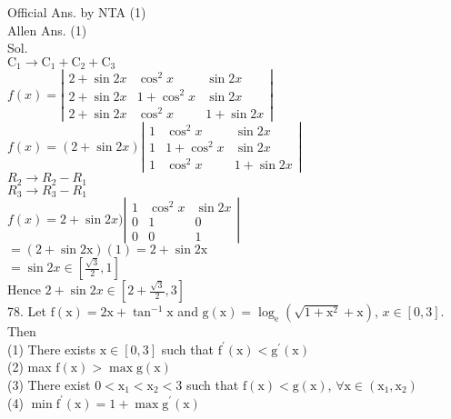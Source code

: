 \documentclass[10pt]{article}
\begin{document}
Official Ans. by NTA (1)\\
Allen Ans. (1)\\
Sol.\\
\(\mathrm{C}_{1} \rightarrow \mathrm{C}_{1}+\mathrm{C}_{2}+\mathrm{C}_{3}\)\\
\(f(x)=\left|\begin{array}{ccc}2+\sin 2 x & \cos ^{2} x & \sin 2 x \\ 2+\sin 2 x & 1+\cos ^{2} x & \sin 2 x \\ 2+\sin 2 x & \cos ^{2} x & 1+\sin 2 x\end{array}\right|\)\\
\(f(x)=(2+\sin 2 x)\left|\begin{array}{ccc}1 & \cos ^{2} x & \sin 2 x \\ 1 & 1+\cos ^{2} x & \sin 2 x \\ 1 & \cos ^{2} x & 1+\sin 2 x\end{array}\right|\)\\
\(R_{2} \rightarrow R_{2}-R_{1}\)\\
\(R_{3} \rightarrow R_{3}-R_{1}\)\\
\(f(x)=2+\sin 2 x)\left|\begin{array}{ccc}1 & \cos ^{2} x & \sin 2 x \\ 0 & 1 & 0 \\ 0 & 0 & 1\end{array}\right|\)\\
\(=(2+\sin 2 \mathrm{x})(1)=2+\sin 2 \mathrm{x}\)\\
\(=\sin 2 x \in\left[\frac{\sqrt{3}}{2}, 1\right]\)\\
Hence \(2+\sin 2 x \in\left[2+\frac{\sqrt{3}}{2}, 3\right]\)\\
78. Let \(\mathrm{f}(\mathrm{x})=2 \mathrm{x}+\tan ^{-1} \mathrm{x}\) and \(\mathrm{g}(\mathrm{x})=\log _{\mathrm{e}}\left(\sqrt{1+\mathrm{x}^{2}}+\mathrm{x}\right)\), \(x \in[0,3]\). Then\\
(1) There exists \(\mathrm{x} \in[0,3]\) such that \(\mathrm{f}^{\prime}(\mathrm{x})<\mathrm{g}^{\prime}(\mathrm{x})\)\\
(2) max \(\mathrm{f}(\mathrm{x})>\max \mathrm{g}(\mathrm{x})\)\\
(3) There exist \(0<\mathrm{x}_{1}<\mathrm{x}_{2}<3\) such that \(\mathrm{f}(\mathrm{x})<\mathrm{g}(\mathrm{x})\), \(\forall \mathrm{x} \in\left(\mathrm{x}_{1}, \mathrm{x}_{2}\right)\)\\
(4) \(\min \mathrm{f}^{\prime}(\mathrm{x})=1+\max \mathrm{g}^{\prime}(\mathrm{x})\)
\end{document}
